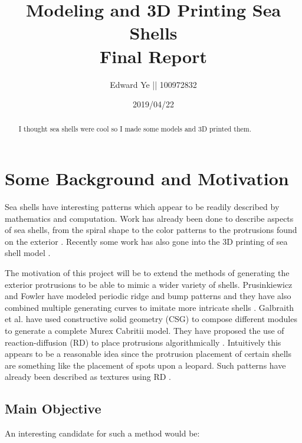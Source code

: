 \documentclass[a4paper]{article}
\title{Modeling and 3D Printing Sea Shells\\
		\large Final Report}
\author{Edward Ye || 100972832}
\date{2019/04/22}
\begin{document}
\maketitle

\begin{abstract}
	I thought sea shells were cool so I made some models and 3D printed them.
\end{abstract}

\tableofcontents

\section{Some Background and Motivation}

Sea shells have interesting patterns which  appear to be readily described by mathematics and computation. Work has already been done to describe aspects of sea shells, from the spiral shape to the color patterns to the protrusions found on the exterior \cite{Galbraith00modelingmurex}\cite{abss}\cite{VANDERHELM1998505}. Recently some work has also gone into the 3D printing of sea shell model \cite{3dprinting-seashells}\cite{bachman-3dprinting}.

The motivation of this project will be to extend the methods of generating the exterior protrusions to be able to mimic a wider variety of shells. Prusinkiewicz and Fowler have modeled periodic ridge and bump patterns and they have also combined multiple generating curves to imitate more intricate shells \cite{abss}. Galbraith et al. have used constructive solid geometry (CSG) to compose different modules to generate a complete Murex Cabritii model. They have proposed the use of reaction-diffusion (RD) to place protrusions algorithmically \cite{Galbraith00modelingmurex}. Intuitively this appears to be a reasonable idea since the protrusion placement of certain shells are something like the placement of spots upon a leopard. Such patterns have already been described as textures using RD \cite{Turk:1991:GTA:127719.122749}.

\pagebreak

\subsection{Main Objective}

An interesting candidate for such a method would be:
\end{document}
